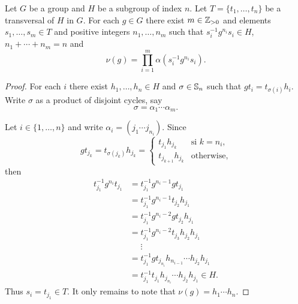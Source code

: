 
\begin{lemma}
	\label{lem:transfer}
	Let $G$ be a group and $H$ be a subgroup of index $n$. Let 
	$T=\{t_1,\dots,t_n\}$ be a transversal of $H$ in $G$.  For each $g\in G$ there exist 
	$m\in\mathbb{Z}_{>0}$ and elements 
	$s_{1},\dots,s_{m}\in T$ and positive integers $n_1,\dots,n_m$
    such that 
	$s_i^{-1}g^{n_i}s_i\in H$,
	$n_1+\cdots+n_m=n$ and 
	\[
		\nu(g)=\prod_{i=1}^m \alpha(s_i^{-1}g^{n_i}s_i).
	\]
\end{lemma}

\begin{proof}
	For each $i$ there exist $h_1,\dots,h_n\in H$ and $\sigma\in\mathbb{S}_n$ such that 
	$gt_i=t_{\sigma(i)}h_i$. Write $\sigma$ as a product of disjoint cycles, say 
	\[
		\sigma=\alpha_1\cdots\alpha_m.
	\]

	Let $i\in\{1,\dots,n\}$ and write 
	$\alpha_i=(j_{1}\cdots j_{n_i})$. Since   
	\[
		g t_{j_k}=t_{\sigma(j_k)}h_{j_k}=\begin{cases}
			t_{j_1}h_{j_k} & \text{si $k=n_i$},\\
			t_{j_{k+1}}h_{j_k} & \text{otherwise},
		\end{cases}
	\]
	then 
	\begin{align*}
	t_{j_1}^{-1}g^{n_i}t_{j_1}
	&=t_{j_1}^{-1}g^{n_i-1}gt_{j_1}\\
	&=t_{j_1}^{-1}g^{n_i-1}t_{j_2}h_{j_1}\\
	&=t_{j_1}^{-1}g^{n_i-2}gt_{j_2}h_{j_1}\\
	&=t_{j_1}^{-1}g^{n_i-2}t_{j_3}h_{j_2}h_{j_1}\\
	&\phantom{=}\vdots\\
	&=t_{j_1}^{-1}gt_{j_{n_i}}h_{n_{i-1}}\cdots h_{j_2}h_{j_1}\\
	&=t_{j_1}^{-1}t_{j_1}h_{j_{n_i}}\cdots h_{j_2}h_{j_1}\in H. 	
	\end{align*}
	Thus $s_i=t_{j_1}\in T$. It only remains to note that $\nu(g)=h_1\cdots h_n$. 
\end{proof}

